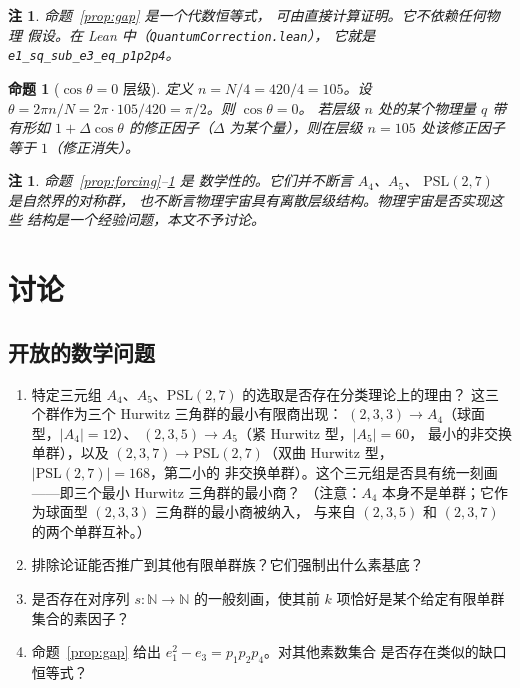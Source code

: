 \documentclass[11pt]{ctexart}
\newtheorem{proposition}[theorem]{命题}
\newtheorem{remark}[theorem]{注}
\begin{document}
\begin{remark}
命题~\ref{prop:gap} 是一个代数恒等式，
可由直接计算证明。它不依赖任何物理
假设。在 Lean 中（\texttt{QuantumCorrection.lean}），
它就是 \texttt{e1\_sq\_sub\_e3\_eq\_p1p2p4}。
\end{remark}

\begin{proposition}[$\cos\theta = 0$ 层级]
\label{prop:cos}
定义 $n = N/4 = 420/4 = 105$。设 $\theta = 2\pi n / N
= 2\pi \cdot 105 / 420 = \pi/2$。则 $\cos\theta = 0$。
若层级 $n$ 处的某个物理量 $q$ 带有形如 $1 + \Delta \cos\theta$ 的修正因子（$\Delta$ 为某个量），则在层级 $n = 105$ 处该修正因子等于 $1$（修正消失）。
\end{proposition}

\begin{remark}
命题~\ref{prop:forcing}--\ref{prop:cos} 是
数学性的。它们并不断言 $A_4$、$A_5$、
$\mathrm{PSL}(2,7)$ 是自然界的对称群，
也不断言物理宇宙具有离散层级结构。物理宇宙是否实现这些
结构是一个经验问题，本文不予讨论。
\end{remark}

\section{讨论}
\label{sec:discussion}

\subsection{开放的数学问题}
\begin{enumerate}
\item 特定三元组 $A_4$、$A_5$、$\mathrm{PSL}(2,7)$ 的选取是否存在分类理论上的理由？
  这三个群作为三个 Hurwitz 三角群的最小有限商出现：
  $(2,3,3) \to A_4$（球面型，$|A_4| = 12$）、
  $(2,3,5) \to A_5$（紧 Hurwitz 型，$|A_5| = 60$，
  最小的非交换单群），以及
  $(2,3,7) \to \mathrm{PSL}(2,7)$（双曲 Hurwitz 型，
  $|\mathrm{PSL}(2,7)| = 168$，第二小的
  非交换单群）。这个三元组是否具有统一刻画——即三个最小 Hurwitz 三角群的最小商？
  （注意：$A_4$ 本身不是单群；它作为球面型 $(2,3,3)$ 三角群的最小商被纳入，
  与来自 $(2,3,5)$ 和 $(2,3,7)$ 的两个单群互补。）
\item 排除论证能否推广到其他有限单群族？它们强制出什么素基底？
\item 是否存在对序列 $s : \mathbb{N} \to \mathbb{N}$ 的一般刻画，使其前 $k$ 项恰好是某个给定有限单群集合的素因子？
\item 命题~\ref{prop:gap} 给出
  $e_1^2 - e_3 = p_1 p_2 p_4$。对其他素数集合
  是否存在类似的缺口恒等式？
\end{enumerate}
\end{document}
